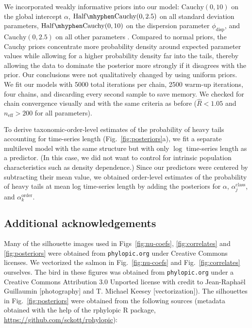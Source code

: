 We incorporated weakly informative priors into our model: $\mathrm{Cauchy}(0,
10)$ on the global intercept $\alpha$, $\mathrm{Half\mhyphen Cauchy}(0, 2.5)$
on all standard deviation parameters, $\mathrm{Half\mhyphen Cauchy}(0, 10)$ on
the dispersion parameter $\phi_\mathrm{disp}$, and $\mathrm{Cauchy}(0, 2.5)$
on all other parameters \citep{gelman2006c, gelman2008d}. Compared to normal
priors, the Cauchy priors concentrate more probability density around expected
parameter values while allowing for a higher probability density far into the
tails, thereby allowing the data to dominate the posterior more strongly if it
disagrees with the prior. Our conclusions were not qualitatively changed by
using uniform priors. We fit our models with 5000 total iterations per chain,
2500 warm-up iterations, four chains, and discarding every second sample to
save memory. We checked for chain convergence visually and with the same
criteria as before ($\widehat{R} < 1.05$ and $n_\mathrm{eff} >200$ for all
parameters).

To derive taxonomic-order-level estimates of the probability of heavy tails
accounting for time-series length (Fig.~\ref{fig:posteriors}a), we fit a
separate multilevel model with the same structure but with only $\log$
time-series length as a predictor. (In this case, we did not want to control
for intrinsic population characteristics such as density dependence.) Since
our predictors were centered by subtracting their mean value, we obtained
order-level estimates of the probability of heavy tails at mean log
time-series length by adding the posteriors for $\alpha$,
$\alpha^\mathrm{class}_j$, and $\alpha^\mathrm{order}_k$.

\subsection{Additional acknowledgements}

Many of the silhouette images used in Figs~\ref{fig:nu-coefs},
\ref{fig:correlates} and \ref{fig:posteriors} were obtained from
\texttt{phylopic.org} under Creative Commons licenses. We vectorized the
salmon in Fig.~\ref{fig:nu-coefs} and Fig.~\ref{fig:correlates} ourselves. The
bird in these figures was obtained from \texttt{phylopic.org} under a Creative
Commons Attribution 3.0 Unported license with credit to Jean-Raphaël
Guillaumin {[}photography{]} and T. Michael Keesey {[}vectorization{]}). The
silhouettes in Fig.~\ref{fig:posteriors} were obtained from the following
sources (metadata obtained with the help of the rphylopic R package,
\url{https://github.com/sckott/rphylopic}):

